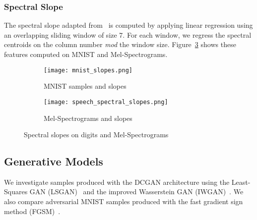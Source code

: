 \subsubsection{Spectral Slope}
The spectral slope adapted from~\cite{peeters2004large} is computed by applying linear regression using an overlapping
sliding window of size 7. For each window, we regress the spectral centroids on
the column number \textit{mod} the window size. Figure~\ref{fig:slopes} shows these
features computed on MNIST and Mel-Spectrograms. 

\begin{figure}[!h]
    \centering
    \begin{subfigure}[b]{0.4\textwidth}
        \texttt{[image: mnist\_slopes.png]}
        \caption{MNIST samples and slopes}
        \label{fig:mnist_slopes}
    \end{subfigure}
    \quad
    \begin{subfigure}[b]{0.4\textwidth}
        \texttt{[image: speech\_spectral\_slopes.png]}
        \caption{Mel-Spectrograms and slopes}
        \label{fig:spectrogram_slopes}
    \end{subfigure}
    \caption{Spectral slopes on digits and Mel-Spectrograms}
    \label{fig:slopes}
\end{figure}

\subsection{Generative Models}
We investigate samples produced with the DCGAN architecture using the
Least-Squares GAN (LSGAN)~\cite{mao2016least} and the improved Wasserstein
GAN (IWGAN)~\cite{gulrajani2017improved}. We also compare adversarial MNIST
samples produced with the fast gradient sign method
(FGSM)~\cite{goodfellow2014explaining}.
